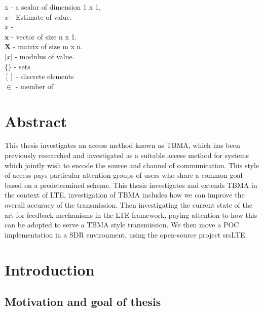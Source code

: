 \documentclass{article}
\begin{document}
x - a scalar of dimension 1 x 1, \\
$\hat{x}$ - Estimate of value.\\
$\tilde{x}$ - \\
$\boldsymbol{x}$ - vector of size n x 1.\\ 
$\boldsymbol{X}$ - matrix of size m x n.\\ 
$|x|$ - modulus of value. \\
$\{\}$ - sets \\
$[]$ - discrete elements \\  
$\in$ - member of \\



\newpage

\section*{Abstract}
This thesis investigates an access method known as \ac{TBMA}, which has been previously researched and investigated as a suitable access method for systems which jointly wish to encode the source and channel of communication. This style of access pays particular attention groups of users who share a common goal based on a predetermined scheme. This thesis investigates and extends \ac{TBMA} in the context of LTE, investigation of \ac{TBMA} includes how we can improve the overall accuracy of the transmission. Then investigating the current state of the art for feedback mechanisms in the LTE framework, paying attention to how this can be adopted to serve a \ac{TBMA} style transmission. We then move a \ac{POC} implementation in a \ac{SDR} environment, using the open-source project srsLTE. 
\newpage

\section{Introduction}\label{intro}
\subsection{Motivation and goal of thesis}
\end{document}
